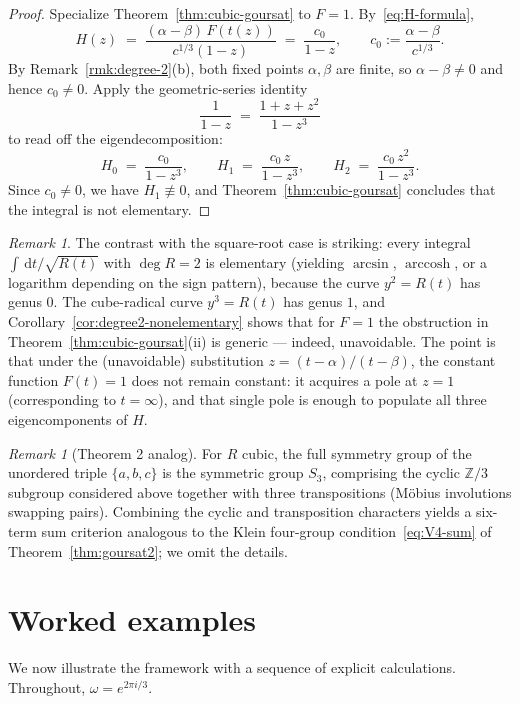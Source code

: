 \documentclass[11pt,a4paper]{article}
\theoremstyle{plain}
\theoremstyle{definition}
\theoremstyle{remark}
\newtheorem{remark}[theorem]{Remark}
\newcommand{\Z}{\mathbb{Z}}
\renewcommand{\d}{\,\mathrm{d}}
\begin{document}
\begin{proof}
Specialize Theorem~\ref{thm:cubic-goursat} to $F = 1$. By~\eqref{eq:H-formula},
\[
  H(z) \;=\; \frac{(\alpha-\beta)\,F(t(z))}{c^{1/3}(1-z)} \;=\; \frac{c_0}{1-z},\qquad c_0 := \frac{\alpha-\beta}{c^{1/3}}.
\]
By Remark~\ref{rmk:degree-2}(b), both fixed points $\alpha,\beta$ are finite, so $\alpha-\beta\neq 0$ and hence $c_0\neq 0$. Apply the geometric-series identity
\[
  \frac{1}{1-z} \;=\; \frac{1+z+z^2}{1-z^3}
\]
to read off the eigendecomposition:
\[
  H_0 \;=\; \frac{c_0}{1-z^3}, \qquad H_1 \;=\; \frac{c_0\,z}{1-z^3}, \qquad H_2 \;=\; \frac{c_0\,z^2}{1-z^3}.
\]
Since $c_0\neq 0$, we have $H_1\not\equiv 0$, and Theorem~\ref{thm:cubic-goursat} concludes that the integral is not elementary.
\end{proof}

\begin{remark}
The contrast with the square-root case is striking: every integral $\int\d t/\sqrt{R(t)}$ with $\deg R = 2$ is elementary (yielding $\arcsin$, $\operatorname{arccosh}$, or a logarithm depending on the sign pattern), because the curve $y^2 = R(t)$ has genus $0$. The cube-radical curve $y^3 = R(t)$ has genus $1$, and Corollary~\ref{cor:degree2-nonelementary} shows that for $F=1$ the obstruction in Theorem~\ref{thm:cubic-goursat}(ii) is generic — indeed, unavoidable. The point is that under the (unavoidable) substitution $z = (t-\alpha)/(t-\beta)$, the constant function $F(t) = 1$ does not remain constant: it acquires a pole at $z = 1$ (corresponding to $t = \infty$), and that single pole is enough to populate all three eigencomponents of $H$.
\end{remark}

\begin{remark}[Theorem 2 analog]
For $R$ cubic, the full symmetry group of the unordered triple $\{a,b,c\}$ is the symmetric group $S_3$, comprising the cyclic $\Z/3$ subgroup considered above together with three transpositions (M\"obius involutions swapping pairs). Combining the cyclic and transposition characters yields a six-term sum criterion analogous to the Klein four-group condition~\eqref{eq:V4-sum} of Theorem~\ref{thm:goursat2}; we omit the details.
\end{remark}


\section{Worked examples}
\label{sec:examples}

We now illustrate the framework with a sequence of explicit calculations. Throughout, $\omega = e^{2\pi i/3}$.
\end{document}
